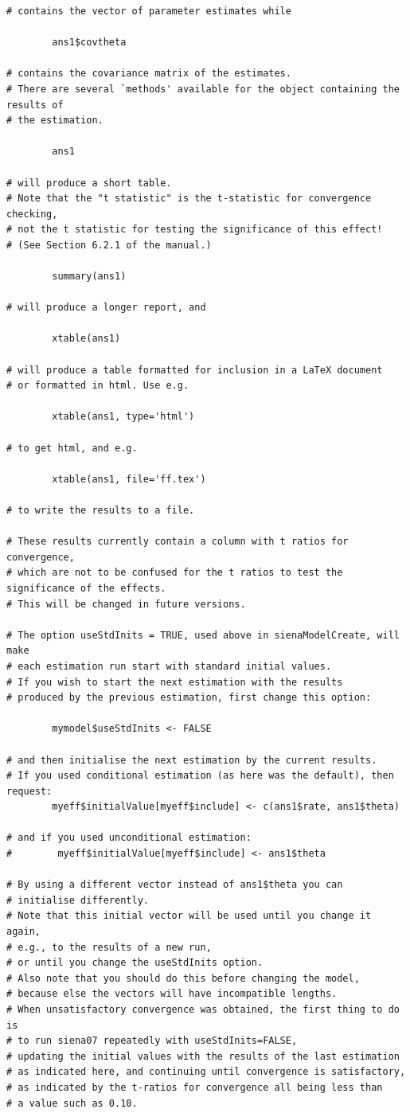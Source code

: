 \documentclass[a4paper,fleqn]{article}
\newcommand{\+}{\, + \,}
\begin{document}
{\begin{verbatim}
# contains the vector of parameter estimates while

        ans1$covtheta

# contains the covariance matrix of the estimates.
# There are several `methods' available for the object containing the results of
# the estimation.

        ans1

# will produce a short table.
# Note that the "t statistic" is the t-statistic for convergence checking,
# not the t statistic for testing the significance of this effect!
# (See Section 6.2.1 of the manual.)

        summary(ans1)

# will produce a longer report, and

        xtable(ans1)

# will produce a table formatted for inclusion in a LaTeX document
# or formatted in html. Use e.g.

        xtable(ans1, type='html')

# to get html, and e.g.

        xtable(ans1, file='ff.tex')

# to write the results to a file.

# These results currently contain a column with t ratios for convergence,
# which are not to be confused for the t ratios to test the significance of the effects.
# This will be changed in future versions.

# The option useStdInits = TRUE, used above in sienaModelCreate, will make
# each estimation run start with standard initial values.
# If you wish to start the next estimation with the results
# produced by the previous estimation, first change this option:

        mymodel$useStdInits <- FALSE

# and then initialise the next estimation by the current results.
# If you used conditional estimation (as here was the default), then request:
        myeff$initialValue[myeff$include] <- c(ans1$rate, ans1$theta)

# and if you used unconditional estimation:
#        myeff$initialValue[myeff$include] <- ans1$theta

# By using a different vector instead of ans1$theta you can
# initialise differently.
# Note that this initial vector will be used until you change it again,
# e.g., to the results of a new run,
# or until you change the useStdInits option.
# Also note that you should do this before changing the model,
# because else the vectors will have incompatible lengths.
# When unsatisfactory convergence was obtained, the first thing to do is
# to run siena07 repeatedly with useStdInits=FALSE,
# updating the initial values with the results of the last estimation
# as indicated here, and continuing until convergence is satisfactory,
# as indicated by the t-ratios for convergence all being less than
# a value such as 0.10.


\end{verbatim}}
\end{document}
